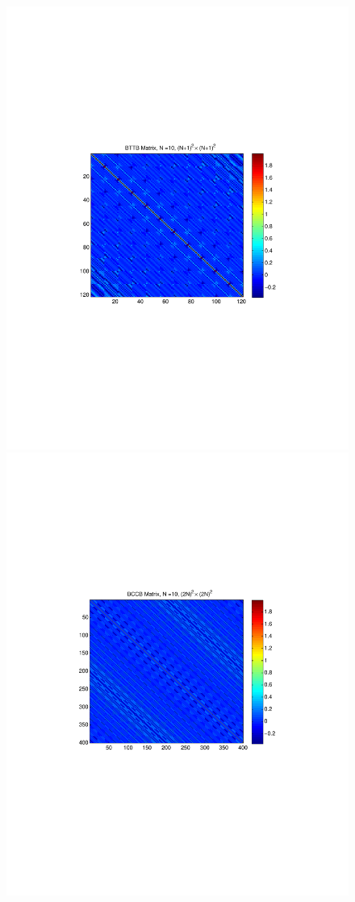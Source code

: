\documentclass{UCF_ETD}
\begin{document}
\begin{figure}[H]
\begin{center}
 \includegraphics[scale=0.6]{PolarSphericalDFT/BTTBMatrixImage}
 \includegraphics[scale=0.6]{PolarSphericalDFT/BCCBMatrixImage}

\end{center}
\end{figure}
\end{document}
